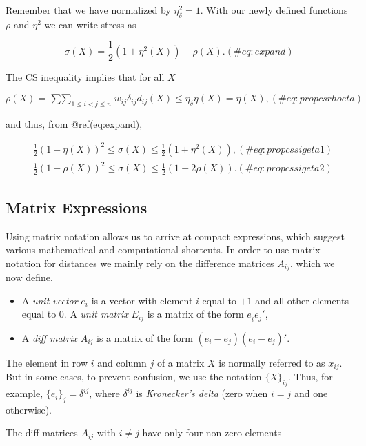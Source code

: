 \documentclass[
  12pt,
  letterpaper,
  DIV=11,
  numbers=noendperiod]{scrreprt}
\theoremstyle{remark}
\begin{document}
Remember that we have normalized by \(\eta_\delta^2=1\). With our newly
defined functions \(\rho\) and \(\eta^2\) we can write stress as

\begin{equation}
\sigma(X)=\frac12(1+\eta^2(X))-\rho(X).
(\#eq:expand)
\end{equation}

The CS inequality implies that for all \(X\)

\begin{equation}
\rho(X)=\mathop{\sum\sum}_{1\leq i<j\leq n}w_{ij}\delta_{ij}d_{ij}(X)\leq\eta_\delta\eta(X)=\eta(X),
(\#eq:propcsrhoeta)
\end{equation}

and thus, from @ref(eq:expand),

\begin{align}
&\frac12(1-\eta(X))^2\leq\sigma(X)\leq\frac12(1+\eta^2(X)),(\#eq:propcssigeta1)\\
&\frac12(1-\rho(X))^2\leq\sigma(X)\leq\frac12(1-2\rho(X)).(\#eq:propcssigeta2)
\end{align}

\subsection{Matrix Expressions}\label{propmatrix}

Using matrix notation allows us to arrive at compact expressions, which
suggest various mathematical and computational shortcuts. In order to
use matrix notation for distances we mainly rely on the difference
matrices \(A_{ij}\), which we now define.

\begin{itemize}
\item
  A \emph{unit vector} \(e_i\) is a vector with element \(i\) equal to
  \(+1\) and all other elements equal to 0. A \emph{unit matrix}
  \(E_{ij}\) is a matrix of the form \(e_i^{\ }e_j'\),
\item
  A \emph{diff matrix} \(A_{ij}\) is a matrix of the form
  \((e_i-e_j)(e_i-e_j)'\).
\end{itemize}

The element in row \(i\) and column \(j\) of a matrix \(X\) is normally
referred to as \(x_{ij}\). But in some cases, to prevent confusion, we
use the notation \(\{X\}_{ij}\). Thus, for example,
\(\{e_i\}_j=\delta^{ij}\), where \(\delta^{ij}\) is \emph{Kronecker's
delta} (zero when \(i=j\) and one otherwise).

The diff matrices \(A_{ij}\) with \(i\not= j\) have only four non-zero
elements
\end{document}
